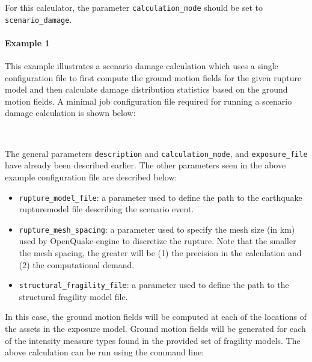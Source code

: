 For this calculator, the parameter \Verb+calculation_mode+ should be set to
\Verb+scenario_damage+.

\paragraph{Example 1}

This example illustrates a scenario damage calculation which uses a single
configuration file to first compute the ground motion fields for the given
rupture model and then calculate damage distribution statistics based on the
ground motion fields. A minimal job configuration file required for
running a scenario damage calculation is shown below:

\inputminted[firstline=1,firstnumber=1,fontsize=\footnotesize,frame=single,linenos,bgcolor=lightgray,label=job.ini]{ini}{oqum/risk/verbatim/config_scenario_damage_combined.ini}\\

The general parameters \Verb+description+ and \Verb+calculation_mode+, and
\Verb+exposure_file+ have already been described earlier. The other parameters
seen in the above example configuration file are described below:

\begin{itemize}

  \item \Verb+rupture_model_file+: a parameter used to define the path
	to the earthquake \gls{rupturemodel} file describing the scenario event.

  \item \Verb+rupture_mesh_spacing+: a parameter used to specify the mesh size
  	(in km) used by OpenQuake-engine to discretize the rupture.
  	Note that the smaller the mesh spacing, the greater will be
  	(1) the precision in the calculation and
  	(2) the computational demand.

  \item \Verb+structural_fragility_file+: a parameter used to define the path
	to the structural \gls{fragility model} file.

\end{itemize}

In this case, the ground motion fields will be computed at each of the
locations of the assets in the exposure model. Ground motion fields will be
generated for each of the intensity measure types found in the provided set of
fragility models. The above calculation can be run using the command line:

